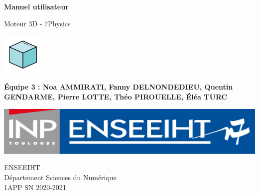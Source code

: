 \begin{titlepage}
   \begin{center}
       \vspace*{5cm}

       \Huge\textbf{Manuel utilisateur}

       \vspace{0.5cm}
       \Large


       Moteur 3D - 7Physics


       \includegraphics[width=2cm]{./logo.png}

       \vspace{1cm}

       \large
       \textbf{Équipe 3 : Noa AMMIRATI, Fanny DELNONDEDIEU, Quentin GENDARME, Pierre LOTTE, Théo PIROUELLE, Éléa TURC}

       \vfill

       \includegraphics[width=15cm]{./enseeiht.jpeg}

       \vspace{2cm}

       ENSEEIHT\\
       Département Sciences du Numérique\\
       1APP SN 2020-2021


   \end{center}
\end{titlepage}
